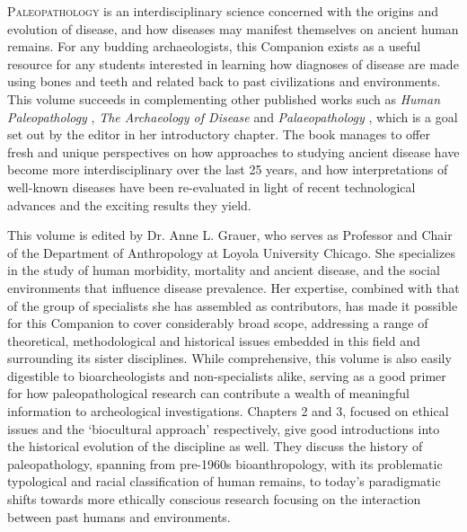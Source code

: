 \documentclass{ijsra}
\begin{document}
\IJSRAopening%


\lettrine{P}{aleopathology} is an interdisciplinary science concerned with the origins and evolution of disease, and how diseases may manifest themselves on ancient human remains. 
For any budding archaeologists, this Companion exists as a useful resource for any students interested in learning how diagnoses of disease are made using bones and teeth and related back to past civilizations and environments.
This volume succeeds in complementing other published works such as \textit{Human Paleopathology} \parencite{Ortner2003a}, \textit{The Archaeology of Disease} \parencite{Roberts2007} and \textit{Palaeopathology} \parencite{Waldron2009}, which is a goal set out by the editor in her introductory chapter.
The book manages to offer fresh and unique perspectives on how approaches to studying ancient disease have become more interdisciplinary over the last 25 years, and how interpretations of well-known diseases have been re-evaluated in light of recent technological advances and the exciting results they yield.

This volume is edited by Dr. Anne L. Grauer, who serves as Professor and Chair of the Department of Anthropology at Loyola University Chicago.
She specializes in the study of human morbidity, mortality and ancient disease, and the social environments that influence disease prevalence.
Her expertise, combined with that of the group of specialists she has assembled as contributors, has made it possible for this Companion to cover considerably broad scope, addressing a range of theoretical, methodological and historical issues embedded in this field and surrounding its sister disciplines.
While comprehensive, this volume is also easily digestible to bioarcheologists and non-specialists alike, serving as a good primer for how paleopathological research can contribute a wealth of meaningful information to archeological investigations.
Chapters 2 and 3, focused on ethical issues and the ‘biocultural approach’ respectively, give good introductions into the historical evolution of the discipline as well.
They discuss the history of paleopathology, spanning from pre-1960s bioanthropology, with its problematic typological and racial classification of human remains, to today’s paradigmatic shifts towards more ethically conscious research focusing on the interaction between past humans and environments.
\end{document}
